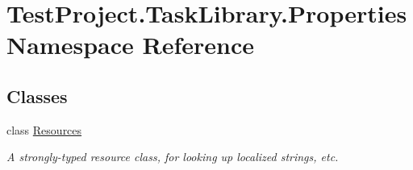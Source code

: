\hypertarget{namespace_test_project_1_1_task_library_1_1_properties}{}\section{Test\+Project.\+Task\+Library.\+Properties Namespace Reference}
\label{namespace_test_project_1_1_task_library_1_1_properties}
\subsection*{Classes}
\begin{DoxyCompactItemize}
\item 
class \mbox{\hyperlink{class_test_project_1_1_task_library_1_1_properties_1_1_resources}{Resources}}
\begin{DoxyCompactList}\small\item\em A strongly-\/typed resource class, for looking up localized strings, etc. \end{DoxyCompactList}\end{DoxyCompactItemize}
